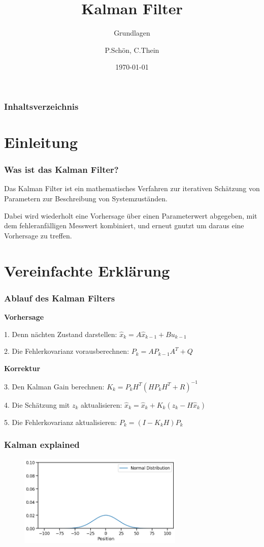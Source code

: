 \documentclass{beamer}
\title{Kalman Filter}
\subtitle{Grundlagen}
\author{P.Schön, C.Thein}
\date{\today}
\begin{document}
\frame{\titlepage}

\begin{frame}
    \frametitle{Inhaltsverzeichnis}
    \tableofcontents
\end{frame}

\section{Einleitung}

\begin{frame}
    \frametitle{Was ist das Kalman Filter?}
    Das Kalman Filter ist ein mathematisches Verfahren zur iterativen Schätzung von Parametern zur
    Beschreibung von Systemzuständen.

    Dabei wird wiederholt eine Vorhersage über einen Parameterwert
    abgegeben, mit dem fehleranfälligen Messwert kombiniert, und erneut gnutzt um daraus eine Vorhersage
    zu treffen.
\end{frame}

\section{Vereinfachte Erklärung}




\begin{frame}
    \frametitle{Ablauf des Kalman Filters}

    \textbf{Vorhersage}

    1. Denn nächten Zustand darstellen: \( \hat{x}_{k} = A\hat{x}_{k-1}+Bu_{k-1} \)

    2. Die Fehlerkovarianz vorausberechnen: \( P_{k}=AP_{k-1}A^{T}+Q \)

    \textbf{Korrektur}

    3. Den Kalman Gain berechnen: \( K_{k}=P_{k}H^{T}(HP_{k}H^T+R)^{-1} \)

    4. Die Schätzung mit \(z_k\) aktualisieren: \( \hat{x}_{k}=\hat{x}_{k}+K_{k}(z_{k}-H\hat{x}_{k}) \)

    5. Die Fehlerkovarianz aktualisieren: \( P_{k}=(I-K_{k}H)P_{k} \)
\end{frame}


\begin{frame}
    \frametitle{Kalman explained}
    \begin{figure}
        \centering
        \includegraphics[width=0.7\textwidth]{images/01_normal_distribution.png}
    \end{figure}
\end{frame}
\end{document}
